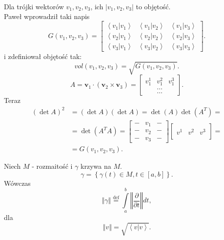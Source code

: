 \documentclass[../main.tex]{subfiles}
\begin{document}
    Dla trójki wektorów $v_1, v_2, v_3$, ich $\left| v_1, v_2, v_3 \right| $ to objętość.\\
    Paweł wprowadził taki napis
    \[
        G(v_1,v_2,v_3) = \begin{bmatrix} \left<v_1|v_1 \right>&\left<v_1|v_2 \right>&\left<v_1|v_3 \right>\\ \left<v_2|v_1 \right>&\left<v_2|v_2 \right>&\left<v_2|v_3 \right>\\ \left<v_3|v_1 \right>&\left<v_3|v_2 \right>&\left<v_3|v_3 \right> \end{bmatrix}
    .\]
i zdefiniował objętość tak:
 \[
     vol(v_1,v_2,v_3) = \sqrt{G(v_1,v_2,v_3)}
.\]
\[
    A = \mathbf{v}_1 \cdot (\mathbf{v}_2 \times \mathbf{v}_3) = \begin{bmatrix} v_1^1&v_1^2&v_1^3\\ &\ldots&\\ &\ldots &\end{bmatrix}
.\]
Teraz
\begin{align*}
    \left( \det A \right)^2 &= \left( \det A \right) \left( \det A \right) = \det(A)\det(A^T) =\\
    &= \det(A^TA) = \begin{bmatrix} -&v_1&-\\ -&v_2&-\\ -&v_3&- \end{bmatrix}\begin{bmatrix} &&\\ v^1&v^2&v^3\\ && \end{bmatrix} =\\
        &=G(v_1,v_2,v_3)
.\end{align*}
\begin{definicja}
    Niech $M$ - rozmaitość i $\gamma$ krzywa na $M$.
    \[
        \gamma = \left\{ \gamma(t)\in M, t\in[a,b] \right\}
    .\]
Wówczas
\[
\left\Vert \gamma \right\Vert \overset{\text{def}}{=} \int\limits_a^b \left\Vert \frac{\partial }{\partial t}  \right\Vert dt
,\]
dla
\[
\left\Vert  v \right\Vert = \sqrt{\left<v|v \right>}
.\]
\end{definicja}
\end{document}
